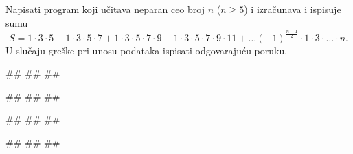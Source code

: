 \begin{Exercise}[difficulty=1, label=PET_48] 
Napisati program koji učitava neparan ceo broj $n$ ($n\geq5$) i izračunava
i ispisuje sumu 
$$S = 1\cdot3\cdot5 - 1\cdot3\cdot5\cdot7 + 1\cdot3\cdot5\cdot7\cdot9
- 1\cdot3\cdot5\cdot7\cdot9\cdot11 + \ldots
(-1)^{\frac{n-1}{2}}\cdot1\cdot3\cdot \ldots \cdot n.$$ U slučaju
greške pri unosu podataka ispisati odgovarajuću poruku. 
  
\begin{miditest}
\begin{upotreba}{1}
#\naslovInt#
##
##
\end{upotreba}
\end{miditest}
\begin{miditest}
\begin{upotreba}{2}
#\naslovInt#
##
##
\end{upotreba}
\end{miditest}

\begin{miditest}
\begin{upotreba}{3}
#\naslovInt#
##
##
\end{upotreba}
\end{miditest}
\begin{miditest}
\begin{upotreba}{4}
#\naslovInt#
##
##
\end{upotreba}
\end{miditest}
\end{Exercise}
\ifresenja
\begin{Answer}[ref=PET_48]
\end{Answer}
\fi



